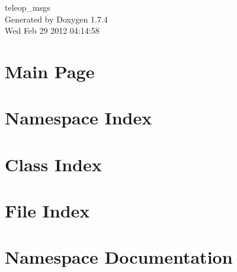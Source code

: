 \documentclass[a4paper]{book}
\begin{document}
\begin{titlepage}
\vspace*{7cm}
\begin{center}
{\Large teleop\_\-msgs }\\
\vspace*{1cm}
{\large Generated by Doxygen 1.7.4}\\
\vspace*{0.5cm}
{\small Wed Feb 29 2012 04:14:58}\\
\end{center}
\end{titlepage}
\clearemptydoublepage
{}
\tableofcontents
\clearemptydoublepage
{}
\chapter{Main Page}
\label{index}
\chapter{Namespace Index}

\chapter{Class Index}

\chapter{File Index}

\chapter{Namespace Documentation}









\end{document}

